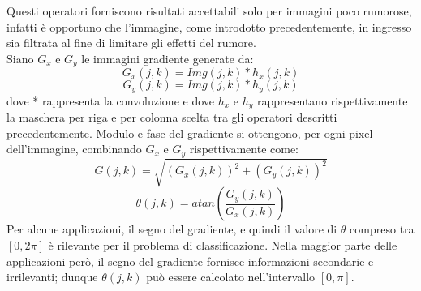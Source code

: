 Questi operatori forniscono risultati accettabili solo per immagini poco rumorose, infatti è opportuno che l'immagine, come introdotto precedentemente, in ingresso sia filtrata al fine di limitare gli effetti del rumore.
\\

Siano $G_{x}$ e $G_{y}$ le immagini gradiente generate da:
\begin{equation}
\label{eq:gradiente_su_x}
G_{x}(j,k)= Img(j,k) * h_{x}(j,k)
\end{equation}
\begin{equation}
\label{eq:gradiente_su_y}
G_{y}(j,k)=Img(j,k) * h_{y}(j,k)
\end{equation}
dove * rappresenta la convoluzione e dove $h_{x}$ e $h_{y}$ rappresentano rispettivamente la maschera per riga e per colonna scelta tra gli operatori descritti precedentemente.
Modulo e fase del gradiente si ottengono, per ogni pixel dell'immagine, combinando $G_{x}$ e $G_{y}$ rispettivamente come:
\begin{equation}
\label{eq:"Forza_del_contorno"}
G(j,k)= \sqrt{(G_{x}(j,k))^2 + (G_{y}(j,k))^2}
\end{equation}
\begin{equation}
\label{eq:"Direzione_del_contorno"}
\theta(j,k)= atan\left (\frac{G_{y}(j,k)}{G_{x}(j,k)}\right )
\end{equation}
Per alcune applicazioni, il segno del gradiente, e quindi il valore di $\theta$ compreso tra $[0,2\pi]$ è rilevante per il problema di classificazione. Nella maggior parte delle applicazioni però, il segno del gradiente fornisce informazioni secondarie e irrilevanti; dunque $\theta(j,k)$ può essere calcolato nell'intervallo $[0,\pi]$.\\


